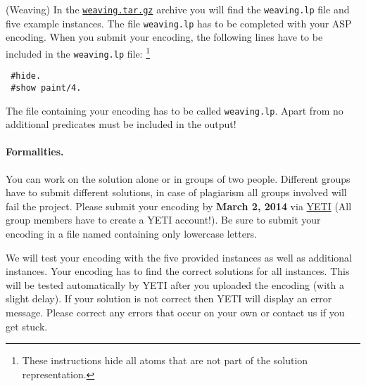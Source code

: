 \documentclass[a4paper,12pt]{article}
\begin{document}
\begin{PraktikumsAufgabe}{1}{(Weaving)}
\noindent
In the
\href{http://www.cs.uni-potsdam.de/wv/lehre/13WS/??-Antwortprog/weaving.tar.gz}{\texttt{weaving.tar.gz}}
archive you will find the \texttt{weaving.lp} file and five example instances.
The file \texttt{weaving.lp} has to be completed with your ASP encoding.
When you submit your encoding, the following lines have to be included in the \texttt{weaving.lp} file:%
\footnote{These instructions hide all atoms that are not part of the solution representation.}%
\vspace{-1.5mm}
\begin{verbatim}
 #hide.
 #show paint/4.
\end{verbatim}
\vspace{-1mm}
{\small\sf The file containing your encoding has to be called \texttt{weaving.lp}.
           Apart from  no additional predicates must be included in the output!}

\noindent


\noindent

\paragraph{Formalities.}
%
You can work on the solution alone or in groups of two people.
Different groups have to submit different solutions, 
in case of plagiarism all groups involved will fail the project.
Please submit your encoding by \textbf{March 2, 2014} via
\href{https://yeti.haiti.cs.uni-potsdam.de/yeti/admin/showCourse.do?id=23}{YETI}
(All group members have to create a YETI account!).
Be sure to submit your encoding in a file named 
containing only lowercase letters.

\noindent
We will test your encoding with the five provided instances as well as additional instances.
Your encoding has to find the correct solutions for all instances.
This will be tested automatically by YETI after you uploaded the encoding (with a slight delay).
If your solution is not correct then YETI will display an error message.
Please correct any errors that occur on your own or contact us if you get stuck.


\end{PraktikumsAufgabe}
\end{document}
